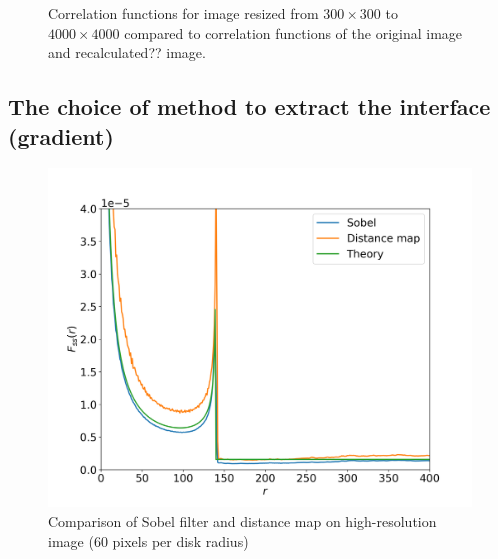 \documentclass[reprint,amsmath,amssymb,aps,pre]{revtex4-1}
\begin{document}
\begin{figure}[ht]
  \centering
  \hfill
  \caption[]{Correlation functions for image resized from $300 \times 300$ to
    $4000 \times 4000$ compared to correlation functions of the original image
    and recalculated?? image.}
  \label{fig:resized-cfs}
\end{figure}

\subsection{The choice of method to extract the interface (gradient)}

\begin{figure}[ht]
  \centering
  \includegraphics[width=0.99\linewidth]{images/sobel-vs-distance-map.png}
  \caption{Comparison of Sobel filter and distance map on high-resolution image (60 pixels per disk radius)}
  \label{fig:sobel-vs-distance-map}
\end{figure}
\end{document}
